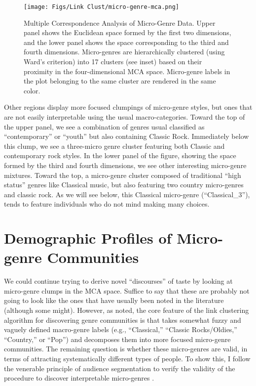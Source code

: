   \begin{figure}[ht!]
 \centering
 \texttt{[image: Figs/Link Clust/micro-genre-mca.png]}
 \caption{Multiple Correspondence Analysis of Micro-Genre Data. Upper panel shows the Euclidean space formed by the first two dimensions, and the lower panel shows the space corresponding to the third and fourth dimensions. Micro-genres are hierarchically clustered (using Ward's criterion) into 17 clusters (see inset) based on their proximity in the four-dimensional MCA space. Micro-genre labels in the plot belonging to the same cluster are rendered in the same color.}
  \label{fig:mca-micro}
 \end{figure}
 
 Other regions display more focused clumpings of micro-genre styles, but ones that are not easily interpretable using the usual macro-categories. Toward the top of the upper panel, we see a combination of genres usual classified as ``contemporary'' or ``youth'' but also containing Classic Rock. Immediately below this clump, we see a three-micro genre cluster featuring both Classic and contemporary rock styles. In the lower panel of the figure, showing the space formed by the third and fourth dimensions, we see other interesting micro-genre mixtures. Toward the top, a micro-genre cluster composed of traditional ``high status'' genres like Classical music, but also featuring two country micro-genres and classic rock. As we will see below, this Classical micro-genre (``Classical\_3''), tends to feature individuals who do not mind making many choices. 
 
\section{Demographic Profiles of Micro-genre Communities}
We could continue trying to derive novel ``discourses'' of taste by looking at micro-genre clumps in the MCA space. Suffice to say that these are probably not going to look like the ones that have usually been noted in the literature (although some might). However, as noted, the core feature of the link clustering algorithm for discovering genre communities is that takes somewhat fuzzy and vaguely defined macro-genre labels (e.g., ``Classical,'' ``Classic Rocks/Oldies,'' ``Country,'' or ``Pop'') and decomposes them into more focused micro-genre communities. The remaining question is whether these micro-genres are valid, in terms of attracting systematically different types of people. To show this, I follow the venerable principle of audience segmentation to verify the validity of the procedure to discover interpretable micro-genres \citep{peterson92}. 

